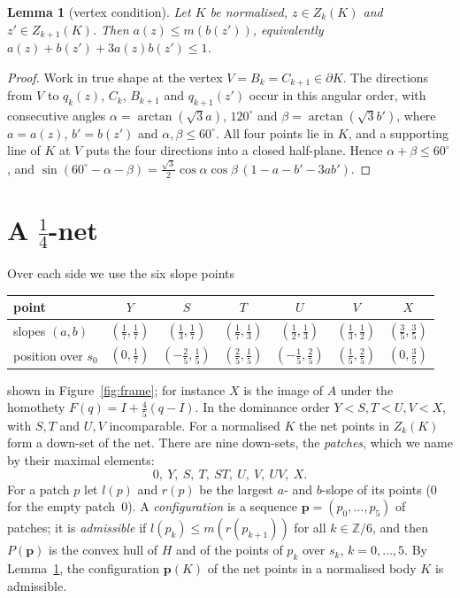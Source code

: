 \documentclass[11pt]{amsart}
\newtheorem{lemma}[theorem]{Lemma}
\theoremstyle{definition}
\theoremstyle{remark}
\begin{document}
\begin{lemma}[vertex condition]\label{lem:vertex}
Let $K$ be normalised, $z\in Z_k(K)$ and $z'\in Z_{k+1}(K)$. Then $a(z)\le m(b(z'))$, equivalently
$a(z)+b(z')+3a(z)b(z')\le1$.
\end{lemma}

\begin{proof}
Work in true shape at the vertex $V=B_k=C_{k+1}\in\partial K$. The directions from $V$ to $q_k(z)$, $C_k$, $B_{k+1}$
and $q_{k+1}(z')$ occur in this angular order, with consecutive angles $\alpha=\arctan(\sqrt3a)$, $120^\circ$ and
$\beta=\arctan(\sqrt3b')$, where $a=a(z)$, $b'=b(z')$ and $\alpha,\beta\le60^\circ$. All four points lie in $K$, and a
supporting line of $K$ at $V$ puts the four directions into a closed half-plane. Hence $\alpha+\beta\le60^\circ$, and
$\sin(60^\circ-\alpha-\beta)=\tfrac{\sqrt3}2\cos\alpha\cos\beta\,(1-a-b'-3ab')$.
\end{proof}

\section{A $\frac14$-net}\label{sec:net}

Over each side we use the six slope points
\begin{center}
\begin{tabular}{lcccccc}
\toprule
point & $Y$ & $S$ & $T$ & $U$ & $V$ & $X$\\
\midrule
slopes $(a,b)$ & $(\frac17,\frac17)$ & $(\frac13,\frac17)$ & $(\frac17,\frac13)$ & $(\frac12,\frac13)$ & $(\frac13,\frac12)$ & $(\frac35,\frac35)$\\[2pt]
position over $s_0$ & $(0,\frac17)$ & $(-\frac25,\frac15)$ & $(\frac25,\frac15)$ & $(-\frac15,\frac25)$ & $(\frac15,\frac25)$ & $(0,\frac35)$\\
\bottomrule
\end{tabular}
\end{center}
shown in Figure~\ref{fig:frame}; for instance $X$ is the image of $A$ under the homothety $F(q)=I+\frac45(q-I)$. In the
dominance order $Y<S,T<U,V<X$, with $S,T$ and $U,V$ incomparable. For a normalised $K$ the net points in $Z_k(K)$ form a
down-set of the net. There are nine down-sets, the \emph{patches}, which we name by their maximal elements:
\[
  0,\ Y,\ S,\ T,\ ST,\ U,\ V,\ UV,\ X .
\]
For a patch $p$ let $l(p)$ and $r(p)$ be the largest $a$- and $b$-slope of its points ($0$ for the empty
patch~$0$). A \emph{configuration} is a sequence $\mathbf p=(p_0,\dots,p_5)$ of patches; it is \emph{admissible} if
$l(p_k)\le m(r(p_{k+1}))$ for all $k\in\mathbb Z/6$, and then $P(\mathbf p)$ is the convex hull of $H$ and of the points of
$p_k$ over $s_k$, $k=0,\dots,5$. By Lemma~\ref{lem:vertex}, the configuration $\mathbf p(K)$ of the net points in a
normalised body $K$ is admissible.
\end{document}
